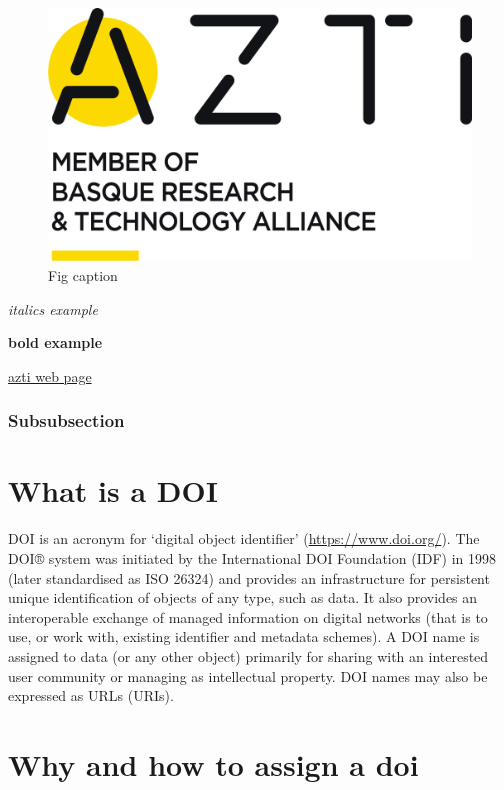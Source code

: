 \documentclass[
]{book}
\begin{document}
\begin{figure}
\centering
\includegraphics{images/AZTI.png}
\caption{Fig caption}
\end{figure}

\emph{italics example}

\textbf{bold example}

\href{www.azti.es}{azti web page}

\hypertarget{subsubsection}{%
\subsection{Subsubsection}\label{subsubsection}}

\hypertarget{what-is-a-doi}{%
\chapter{What is a DOI}\label{what-is-a-doi}}

DOI is an acronym for `digital object identifier' (\url{https://www.doi.org/}). The DOI® system was initiated by the International DOI Foundation (IDF) in 1998 (later standardised as ISO 26324) and provides an infrastructure for persistent unique identification of objects of any type, such as data. It also provides an interoperable exchange of managed information on digital networks (that is to use, or work with, existing identifier and metadata schemes). A DOI name is assigned to data (or any other object) primarily for sharing with an interested user community or managing as intellectual property. DOI names may also be expressed as URLs (URIs).

\hypertarget{why-and-how-to-assign-a-doi}{%
\chapter{Why and how to assign a doi}\label{why-and-how-to-assign-a-doi}}
\end{document}
